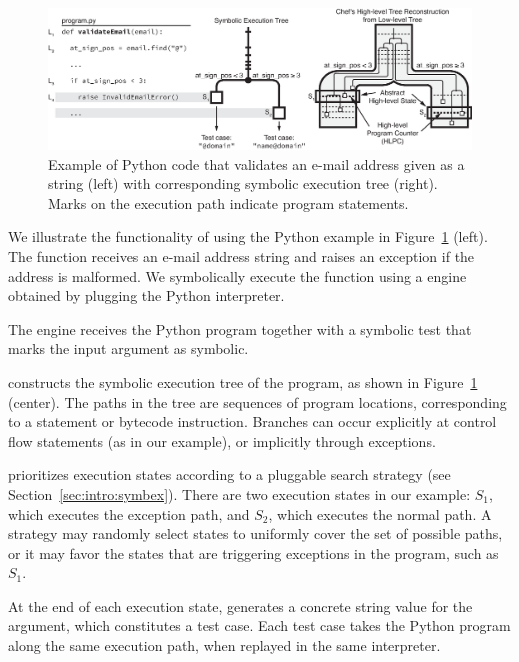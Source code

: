 \begin{figure}
  \centering
  \includegraphics[width=\textwidth]{figures/chef/running-example}
  \caption{Example of Python code that validates an e-mail address given as a string (left) with corresponding symbolic execution tree (right).  Marks on the execution path indicate program statements.}
  \label{fig:chef:running-example}
\end{figure}

We illustrate the functionality of \chef using the Python example in Figure~\ref{fig:chef:running-example} (left).
%
The function  receives an e-mail address string and raises an exception if the address is malformed.
%
We symbolically execute the function using a \chef engine obtained by plugging the Python interpreter.

The \chef engine receives the Python program together with a symbolic test that marks the  input argument as symbolic.

\chef constructs the symbolic execution tree of the program, as shown in Figure~\ref{fig:chef:running-example} (center).
%
The paths in the tree are sequences of program locations, corresponding to a statement or bytecode instruction.  Branches can occur explicitly at control flow statements (as in our example), or implicitly through exceptions.

\chef prioritizes execution states according to a pluggable search strategy (see Section~\ref{sec:intro:symbex}).
%
There are two execution states in our example: $S_1$, which executes the exception path, and $S_2$, which executes the normal path.
%
A strategy may randomly select states to uniformly cover the set of possible paths, or it may favor the states that are triggering exceptions in the program, such as $S_1$.

At the end of each execution state, \chef generates a concrete string value for the  argument, which constitutes a test case.
%
Each test case takes the Python program along the same execution path, when replayed in the same interpreter.


